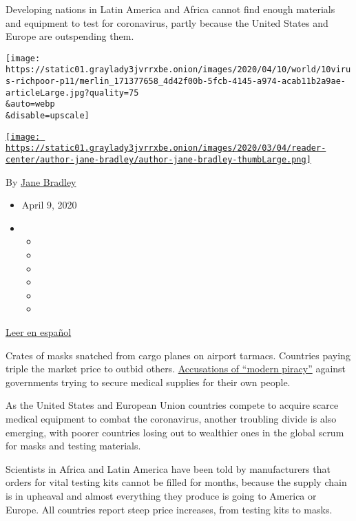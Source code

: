 Developing nations in Latin America and Africa cannot find enough
materials and equipment to test for coronavirus, partly because the
United States and Europe are outspending them.

\texttt{[image: https://static01.graylady3jvrrxbe.onion/images/2020/04/10/world/10virus-richpoor-p11/merlin\_171377658\_4d42f00b-5fcb-4145-a974-acab11b2a9ae-articleLarge.jpg?quality=75\\\&auto=webp\\\&disable=upscale]}

\href{https://www.nytimes3xbfgragh.onion/by/jane-bradley}{\texttt{[image: https://static01.graylady3jvrrxbe.onion/images/2020/03/04/reader-center/author-jane-bradley/author-jane-bradley-thumbLarge.png]}}

By \href{https://www.nytimes3xbfgragh.onion/by/jane-bradley}{Jane
Bradley}

\begin{itemize}
\item
  April 9, 2020
\item
  \begin{itemize}
  \item
  \item
  \item
  \item
  \item
  \item
  \end{itemize}
\end{itemize}

\href{https://www.nytimes3xbfgragh.onion/es/2020/04/09/espanol/coronavirus-paises-desarrollo.html}{Leer
en español}

Crates of masks snatched from cargo planes on airport tarmacs. Countries
paying triple the market price to outbid others.
\href{https://www.nytimes3xbfgragh.onion/2020/04/06/business/economy/peter-navarro-coronavirus-defense-production-act.html}{Accusations
of ``modern piracy''} against governments trying to secure medical
supplies for their own people.

As the United States and European Union countries compete to acquire
scarce medical equipment to combat the coronavirus, another troubling
divide is also emerging, with poorer countries losing out to wealthier
ones in the global scrum for masks and testing materials.

Scientists in Africa and Latin America have been told by manufacturers
that orders for vital testing kits cannot be filled for months, because
the supply chain is in upheaval and almost everything they produce is
going to America or Europe. All countries report steep price increases,
from testing kits to masks.

